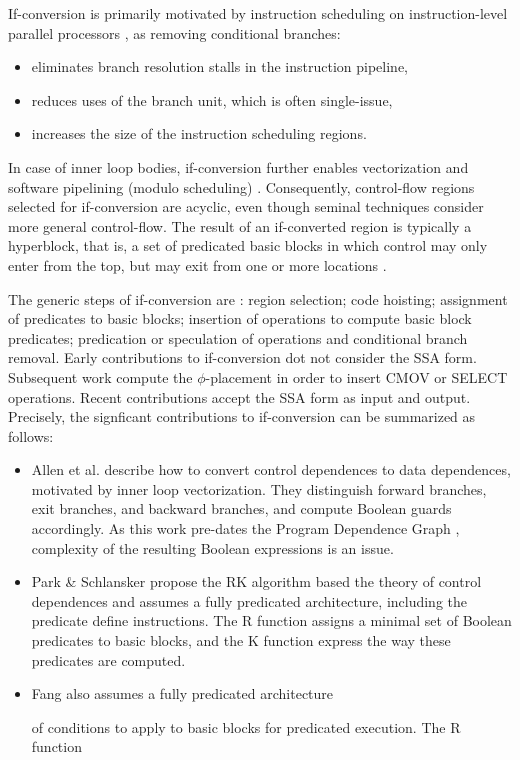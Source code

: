 If-conversion is primarily motivated by instruction scheduling on
instruction-level parallel processors \cite{Mahlke:1995:ISCA}, as removing
conditional branches: \begin{itemize} \item eliminates branch resolution stalls
in the instruction pipeline, \item reduces uses of the branch unit, which is
often single-issue, \item increases the size of the instruction scheduling
regions.  \end{itemize} In case of inner loop bodies, if-conversion further
enables vectorization \cite{Allen:1993:POPL} and software pipelining (modulo
scheduling) \cite{Park:1991:HPL58}. Consequently, control-flow regions selected
for if-conversion are acyclic, even though seminal techniques
\cite{Allen:1993:POPL, Park:1991:HPL58} consider more general control-flow.
The result of an if-converted region is typically a hyperblock, that is, a set
of predicated basic blocks in which control may only enter from the top, but may
exit from one or more locations \cite{Mahlke:1992:MICRO}.
\medskip

The generic steps of if-conversion are \cite{Fang:1996:LCPC}: region selection;
code hoisting; assignment of predicates to basic blocks; insertion of
operations to compute basic block predicates; predication or speculation of
operations and conditional branch removal. Early contributions to if-conversion
dot not consider the SSA form. Subsequent work compute the $\phi$-placement in
order to insert CMOV or SELECT operations. Recent contributions accept the SSA
form as input and output. Precisely, the signficant contributions to
if-conversion can be summarized as follows: \begin{itemize}

\item Allen et al. \cite{Allen:1983:POPL} describe how to convert control
dependences to data dependences, motivated by inner loop vectorization. They
distinguish forward branches, exit branches, and backward branches, and compute
Boolean guards accordingly. As this work pre-dates the Program Dependence Graph
\cite{Ferreante:1987:TOPLAS}, complexity of the resulting Boolean expressions is
an issue.

\item Park \& Schlansker \cite{Park:1991:TR58} propose the RK algorithm based
the theory of control dependences and assumes a fully predicated architecture,
including the predicate define instructions. The R function assigns a minimal
set of Boolean predicates to basic blocks, and the K function express the way
these predicates are computed.

\item Fang \cite{Fang:1996:LCPC} also assumes a fully predicated architecture

of conditions to
apply to basic blocks for predicated execution. The R function

\end{itemize}

